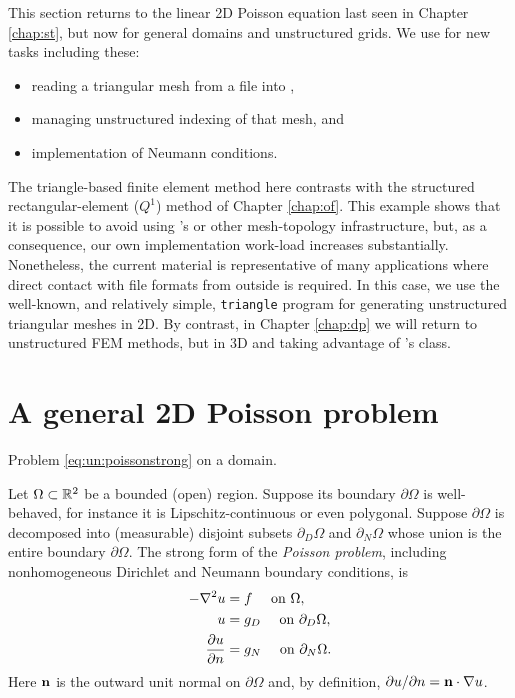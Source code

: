 
This section returns to the linear 2D Poisson equation last seen in Chapter \ref{chap:st}, but now for general domains and unstructured grids.  We use \PETSc for new tasks including these:
\begin{itemize}
\item reading a triangular mesh from a file into \PETSc \pVecs,
\item managing unstructured indexing of that mesh, and
\item implementation of Neumann conditions.
\end{itemize}

The triangle-based finite element method here contrasts with the structured rectangular-element ($Q^1$) method of Chapter \ref{chap:of}.  This example shows that it is possible to avoid using \PETSc's \pDMDA or other mesh-topology infrastructure, but, as a consequence, our own implementation work-load increases substantially.  Nonetheless, the current material is representative of many \PETSc applications where direct contact with file formats from outside \PETSc is required.  In this case, we use the well-known, and relatively simple, \texttt{triangle} program for generating unstructured triangular meshes in 2D.  By contrast, in Chapter \ref{chap:dp} we will return to unstructured FEM methods, but in 3D and taking advantage of \PETSc's \pDMPlex class.


\section{A general 2D Poisson problem}

\begin{marginfigure}

\caption{Problem \eqref{eq:un:poissonstrong} on a domain.}
\label{fig:un:generalpoissondomain}
\end{marginfigure}

Let $\Omega \subset \mathbb{R}^2$ be a bounded (open) region.  Suppose its boundary $\partial\Omega$ is well-behaved, for instance it is Lipschitz-continuous \citep[section 1.2]{Ciarlet2002} or even polygonal.  Suppose $\partial\Omega$ is decomposed into (measurable) disjoint subsets $\partial_D \Omega$ and $\partial_N \Omega$ whose union is the entire boundary $\partial \Omega$.  The strong form of the \emph{Poisson problem}, including nonhomogeneous Dirichlet and Neumann boundary conditions, is
\begin{align}
- \nabla^2 u &= f \quad \text{ on } \Omega, \label{eq:un:poissonstrong} \\
u &= g_D \quad \text{ on } \partial_D \Omega, \notag \\
\frac{\partial u}{\partial n} &= g_N \quad \text{ on } \partial_N \Omega. \notag
\end{align}
Here $\mathbf{n}$ is the outward unit normal on $\partial \Omega$ and, by definition, $\partial u/\partial n = \mathbf{n} \cdot \nabla u$.

